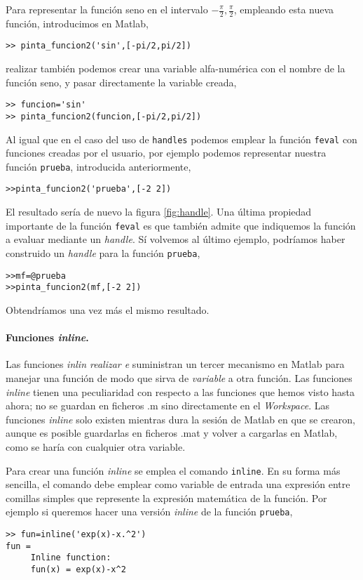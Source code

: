 Para representar la función seno en el intervalo $-\frac{\pi}{2}, \frac{\pi}{2}$, empleando esta nueva función, introducimos en Matlab,

\begin{verbatim}
>> pinta_funcion2('sin',[-pi/2,pi/2])
\end{verbatim}
 realizar 
también podemos crear una variable alfa-numérica con el nombre de la función seno, y pasar directamente la variable creada,

\begin{verbatim}
>> funcion='sin'
>> pinta_funcion2(funcion,[-pi/2,pi/2])
\end{verbatim}

Al igual que en el caso del uso de \texttt{handles} podemos emplear la función \texttt{feval} con funciones creadas por el usuario, por ejemplo podemos representar nuestra función \texttt{prueba}, introducida anteriormente, 

\begin{verbatim}
>>pinta_funcion2('prueba',[-2 2])
\end{verbatim}

El resultado sería de nuevo la figura \ref{fig:handle}.  Una última propiedad importante de la función \texttt{feval} es que también admite que indiquemos la función a evaluar mediante un \emph{handle}. Sí volvemos al último ejemplo, podríamos haber construido un \emph{handle} para la función \texttt{prueba},
\begin{verbatim}
>>mf=@prueba
>>pinta_funcion2(mf,[-2 2])
\end{verbatim} 

Obtendríamos una vez más el mismo resultado.

\paragraph{Funciones \emph{inline}.}  Las funciones \emph{inlin realizar e} suministran un tercer mecanismo en Matlab para manejar una función de modo que sirva de \emph{variable}  a otra función. Las funciones \emph{inline} tienen una peculiaridad con respecto a las funciones que hemos visto hasta ahora; no se guardan en ficheros .m sino directamente en el \emph{Workspace}. Las funciones \emph{inline} solo existen mientras dura la sesión de Matlab en que se crearon, aunque es posible guardarlas en ficheros .mat y volver a cargarlas en Matlab, como se haría con cualquier otra variable.

Para crear una función \emph{inline} se emplea el comando \texttt{inline}. En su forma más sencilla, el comando debe emplear como variable de entrada una expresión entre comillas simples que represente la expresión matemática de la función. Por ejemplo si queremos hacer una versión \emph{inline} de la función \texttt{prueba},
\begin{verbatim}
>> fun=inline('exp(x)-x.^2')
fun =
     Inline function:
     fun(x) = exp(x)-x^2
\end{verbatim}

